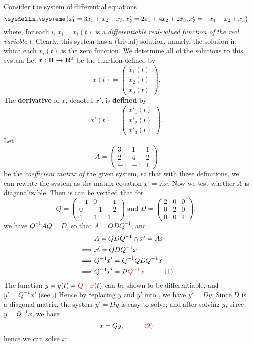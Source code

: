Consider the system of differential equations
\[
    \sysdelim..\systeme{
        x'_1 = 3 x_1 + x_2 + x_3,
        x'_2 = 2 x_1 + 4 x_2 + 2 x_3,
        x'_3 = - x_1 - x_2 + x_3
    }
\]
where, for each \(i\), \(x_i = x_i(t)\) is a \emph{differentiable real-valued function of the real variable \(t\)}.
Clearly, this system has a (trivial) solution, namely, the solution in which each \(x_i(t)\) is the zero function.
We determine all of the solutions to this system
Let \(x : \mathbf{R} \to \mathbf{R}^3\) be the function defined by
\[
    x(t) = \begin{pmatrix} x_1(t) \\ x_2(t) \\ x_3(t) \end{pmatrix}.
\]
The \textbf{derivative} of \(x\), denoted \(x'\), is \textbf{defined} by
\[
    x'(t) = \begin{pmatrix} x'_1(t) \\ x'_2(t) \\ x'_3(t) \end{pmatrix}.
\]
Let
\[
    A = \begin{pmatrix} 3 & 1 & 1 \\ 2 & 4 & 2 \\ -1 & -1 & 1 \end{pmatrix}
\]
be the \emph{coefficient matrix of} the given system, so that with these definitions, we can rewrite the system as the matrix equation \(x' = Ax\).
Now we test whether \(A\) is diagonalizable.
Then is can be verified that for
\[
    Q = \begin{pmatrix}
        -1 & 0 & -1 \\ 0 & -1 & -2 \\ 1 & 1 & 1
    \end{pmatrix}
    \text{ and }
    D = \begin{pmatrix}
        2 & 0 & 0 \\ 0 & 2 & 0 \\ 0 & 0 & 4
    \end{pmatrix},
\]
we have \(Q^{-1}AQ = D\), so that \(A = Q D Q^{-1}\), and
\begin{align*}
             & A = Q D Q^{-1} \land x' = Ax \\
    \implies & x' = QDQ^{-1} x \\
    \implies & Q^{-1}x' = Q^{-1} Q D Q^{-1} x \\
    \implies & Q^{-1}x' = D \RED{Q^{-1} x} \quad \quad \quad \MAROON{(1)}
\end{align*}
The function \(y = y(t) = \RED{Q^{-1} x}(t)\) can be shown to be differentiable, and \(y' = Q^{-1} x'\)
(see .)
Hence by replacing \(y\) and \(y'\) into , we have \(y' = Dy\).
Since \(D\) is a diagonal matrix, the system \(y' = Dy\) is easy to solve;
and after solving \(y\), since \(y = Q^{-1}x\), we have
\[
    x = Qy, \quad \quad \quad \MAROON{(2)}
\]
hence we can solve \(x\).


